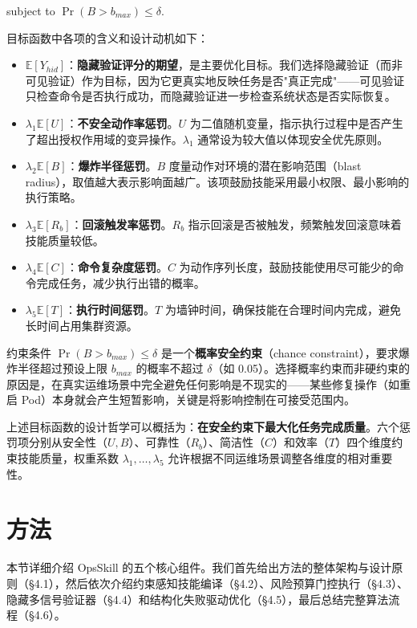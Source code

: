 \documentclass[11pt,a4paper]{ctexart}
\begin{document}
\noindent subject to $\Pr(B > b_{max}) \le \delta$.

\noindent 目标函数中各项的含义和设计动机如下：
\begin{itemize}[leftmargin=2em]
  \item $\mathbb{E}[Y_{hid}]$：\textbf{隐藏验证评分的期望}，是主要优化目标。我们选择隐藏验证（而非可见验证）作为目标，因为它更真实地反映任务是否"真正完成"——可见验证只检查命令是否执行成功，而隐藏验证进一步检查系统状态是否实际恢复。
  \item $\lambda_1 \mathbb{E}[U]$：\textbf{不安全动作率惩罚}。$U$ 为二值随机变量，指示执行过程中是否产生了超出授权作用域的变异操作。$\lambda_1$ 通常设为较大值以体现安全优先原则。
  \item $\lambda_2 \mathbb{E}[B]$：\textbf{爆炸半径惩罚}。$B$ 度量动作对环境的潜在影响范围（blast radius），取值越大表示影响面越广。该项鼓励技能采用最小权限、最小影响的执行策略。
  \item $\lambda_3 \mathbb{E}[R_b]$：\textbf{回滚触发率惩罚}。$R_b$ 指示回滚是否被触发，频繁触发回滚意味着技能质量较低。
  \item $\lambda_4 \mathbb{E}[C]$：\textbf{命令复杂度惩罚}。$C$ 为动作序列长度，鼓励技能使用尽可能少的命令完成任务，减少执行出错的概率。
  \item $\lambda_5 \mathbb{E}[T]$：\textbf{执行时间惩罚}。$T$ 为墙钟时间，确保技能在合理时间内完成，避免长时间占用集群资源。
\end{itemize}

\noindent 约束条件 $\Pr(B > b_{max}) \le \delta$ 是一个\textbf{概率安全约束}（chance constraint），要求爆炸半径超过预设上限 $b_{max}$ 的概率不超过 $\delta$（如 0.05）。选择概率约束而非硬约束的原因是，在真实运维场景中完全避免任何影响是不现实的——某些修复操作（如重启 Pod）本身就会产生短暂影响，关键是将影响控制在可接受范围内。

上述目标函数的设计哲学可以概括为：\textbf{在安全约束下最大化任务完成质量}。六个惩罚项分别从安全性（$U, B$）、可靠性（$R_b$）、简洁性（$C$）和效率（$T$）四个维度约束技能质量，权重系数 $\lambda_1, \ldots, \lambda_5$ 允许根据不同运维场景调整各维度的相对重要性。


\section{方法}

本节详细介绍 OpsSkill 的五个核心组件。我们首先给出方法的整体架构与设计原则（§4.1），然后依次介绍约束感知技能编译（§4.2）、风险预算门控执行（§4.3）、隐藏多信号验证器（§4.4）和结构化失败驱动优化（§4.5），最后总结完整算法流程（§4.6）。
\end{document}
